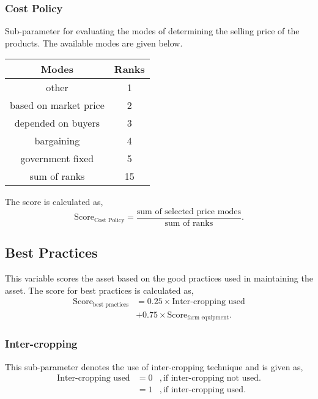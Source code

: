 \documentclass[oneside,twocolumn]{article}
\newcommand{\tsub}[2]{\text{#1}_{\text{#2}}}
\begin{document}
\subsubsection{Cost Policy}
Sub-parameter for evaluating the modes of determining the selling price of the products. The available modes are given below.
\begin{center}
  \begin{tabular}{c|c}
    \hline
    Modes & Ranks \\ \hline
    other & 1 \\
    based on market price & 2 \\
    depended on buyers & 3 \\
    bargaining & 4 \\
    government fixed & 5 \\ \hline
    sum of ranks & 15 \\ \hline
  \end{tabular}
\end{center}
The score is calculated as,
\[
\text{Score}_{\text{Cost Policy}} = \dfrac{\text{sum of selected price modes}}{\text{sum of ranks}}.
\]

\subsection{Best Practices}
This variable scores the asset based on the good practices used in maintaining the asset.
The score for best practices is calculated as,
\begin{align*}
  \tsub{Score}{best practices} &= 0.25 \times \text{Inter-cropping used} \\
  &+ 0.75 \times \tsub{Score}{farm equipment}.
\end{align*}

\subsubsection{Inter-cropping}
This sub-parameter denotes the use of inter-cropping technique and is given as,
\begin{align*}
\text{Inter-cropping used} &= 0 &, \text{if inter-cropping not used}. \\
&= 1 &, \text{if inter-cropping used}.
\end{align*}
\end{document}
